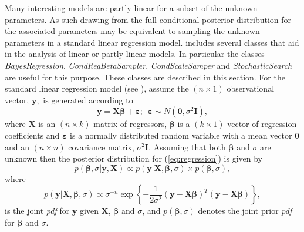 \documentclass[article]{jss}
\begin{document}
Many interesting models are partly linear for a subset of the unknown
parameters. As such drawing from the full conditional posterior
distribution for the associated parameters may be equivalent to
sampling the unknown parameters in a standard linear regression model.  includes several classes
that aid in the analysis of linear or partly linear models. In particular the classes
\emph{BayesRegression}, \emph{CondRegBetaSampler}, \emph{CondScaleSamper} and \emph{StochasticSearch}
are useful for this purpose. These classes are described in this section.
For the standard linear regression model (see \cite{Zellner1971}), assume the
$\left(n\times1\right)$ observational vector, $\bm{y},$ is generated
according to\begin{equation}
  \bm{y}=\bm{X}\bm{\beta}+\bm{\varepsilon};\,\,\,\bm{\varepsilon}\sim
  N(\bm{0},\sigma^{2}\bm{I}),\label{eq:regression}
\end{equation} where
$\bm{X}$ is an $(n\times k)$ matrix of regressors, $\bm{\beta}$ is a
$\left(k\times1\right)$ vector of regression coefficients and
$\bm{\varepsilon}$ is a normally distributed random variable with a
mean vector $\bm{0}$ and an $\left(n\times n\right)$ covariance
matrix, $\sigma^{2}\bm{I}.$ Assuming that both $\bm{\beta}$ and
$\sigma$ are unknown then the posterior distribution for
(\ref{eq:regression}) is given by\begin{equation}
  p(\bm{\beta},\sigma|\bm{y},\bm{X})\propto
  p(\bm{y}|\bm{X},\bm{\beta},\sigma)\times
  p(\bm{\beta},\sigma),\label{eq:post regression}
\end{equation} where
\begin{equation}
  p(\bm{y}|\bm{X},\bm{\beta},\sigma)\propto\sigma^{-n}\exp\left\{
    -\frac{1}{2\sigma^{2}}\left(\bm{y}-\bm{X}\bm{\beta}\right)^{T}\left(\bm{y}-\bm{X}\bm{\beta}\right)\right\}
  ,\label{eq:likelihood regression}
\end{equation} is the joint
\emph{pdf} for $\bm{y}$ given $\bm{X}$, $\bm{\beta}$ and
$\sigma$, and\emph{ $p(\bm{\beta},\sigma)$ } denotes the joint
prior \emph{pdf} for $\bm{\beta}$ and $\sigma$.
\end{document}
